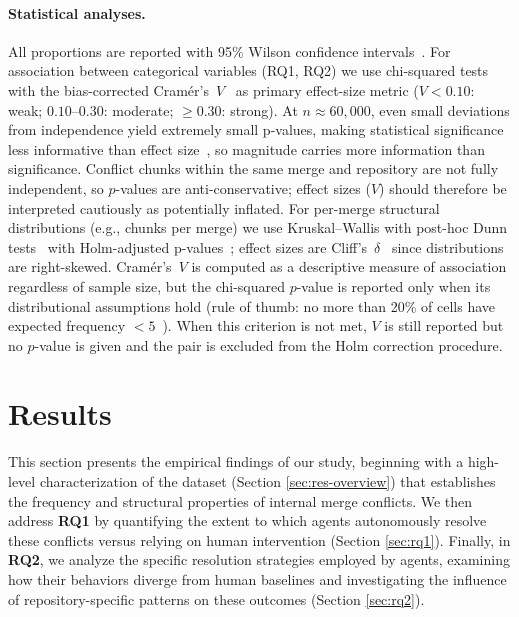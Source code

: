 \documentclass[sigconf,anonymous]{acmart}
\begin{document}
\paragraph{Statistical analyses.}
All proportions are reported with 95\% Wilson confidence intervals~\cite{wilson1927probable}. For association between categorical variables (RQ1, RQ2) we use chi-squared tests with the bias-corrected Cram\'{e}r's~$V$~\cite{bergsma2013bias} as primary effect-size metric ($V{<}0.10$: weak; $0.10$--$0.30$: moderate; ${\geq}0.30$: strong). At $n{\approx}60{,}000$, even small deviations from independence yield extremely small p-values, making statistical significance less informative than effect size~\cite{cohen1988statistical, agresti2013categorical}, so magnitude carries more information than significance. Conflict chunks within the same merge and repository are not fully independent, so $p$-values are anti-conservative; effect sizes ($V$) should therefore be interpreted cautiously as potentially inflated. For per-merge structural distributions (e.g., chunks per merge) we use Kruskal--Wallis with post-hoc Dunn tests~\cite{dunn1964multiple} with Holm-adjusted p-values~\cite{holm1979simple}; effect sizes are Cliff's~$\delta$~\cite{cliff1993dominance} since distributions are right-skewed. Cram\'{e}r's~$V$ is computed as a descriptive measure of association regardless of sample size, but the chi-squared $p$-value is reported only when its distributional assumptions hold (rule of thumb: no more than 20\% of cells have expected frequency ${<}5$~\cite{cochran1954methods}). When this criterion is not met, $V$ is still reported but no $p$-value is given and the pair is excluded from the Holm correction procedure.

\section{Results}
\label{sec:results}

This section presents the empirical findings of our study, beginning with a high-level characterization of the dataset (Section \ref{sec:res-overview}) that establishes the frequency and structural properties of internal merge conflicts. We then address \textbf{RQ1} by quantifying the extent to which agents autonomously resolve these conflicts versus relying on human intervention (Section \ref{sec:rq1}). Finally, in \textbf{RQ2}, we analyze the specific resolution strategies employed by agents, examining how their behaviors diverge from human baselines and investigating the influence of repository-specific patterns on these outcomes (Section \ref{sec:rq2}).
\end{document}
